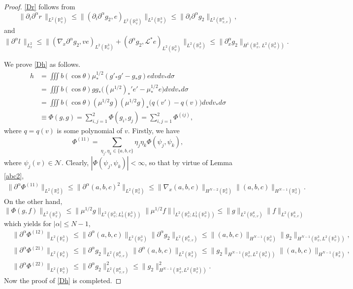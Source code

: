 \documentclass{amsart}[12pt, article]
\begin{document}
\begin{proof}
\eqref{Dr} follows {}from
\[
\|{{\partial}}_i{{\partial}}^\alpha r\,\|_{L^2({{{\mathbb R}}}^3_x)}
\le
\| ({{\partial}}_i{{\partial}}^\alpha g_2, e)_{L^2({{{\mathbb R}}}^3_v)}\|_{L^2({{{\mathbb R}}}^3_x)}
\le
\|{{\partial}}_i{{\partial}}^\alpha  g_2\|_{L^2({{{\mathbb R}}}^6_{x, v})},
\]
and
\[
\|{{\partial}}^\alpha   l\,\|_{L^2_{x}}\le
\| (\nabla_x{{\partial}}^\alpha g_2, ve)_{L^2({{{\mathbb R}}}^3_v)}+({{\partial}}^\alpha g_2, \mathcal{L}^*e)_{L^2({{{\mathbb R}}}^3_v)}\|_{L^2({{{\mathbb R}}}^3_x)}
\le
\| {{\partial}}^{\alpha}_xg_2\|_{H^{1}({{{\mathbb R}}}^3_{x},\, L^2({{{\mathbb R}}}^3_v))}.
\]

We prove \eqref{Dh} as follows.
\begin{align*}
 h&=\iiint b(\cos\theta)\mu_*^{1/2}(g'_*g'-g_*g)edvdv_*d\sigma
\\&=\iiint b(\cos\theta)g g_*\Big((\mu^{1/2})_*'e'-\mu_*^{1/2}e\Big)dvdv_*d\sigma
\\&=\iiint b(\cos\theta)(\mu^{1/2}g)(\mu^{1/2} g)_*\Big(q(v')-q(v)\Big)dvdv_*d\sigma
\\&\equiv \Phi(g,g)=\sum_{i,j=1}^2\Phi(g_i,g_j)=\sum_{i,j=1}^2\Phi^{(ij)}, 
\end{align*}
where $q=q(v)$ is some polynomial of $v$.
Firstly, we have
\[
\Phi^{(11)}=\sum_{\eta_j, \eta_k\in \{a,b,c\}} \eta_j\eta_k\Phi(\psi_j,\psi_k),
\]
where $
\psi_j(v)\in \mathcal{N}$.
Clearly, $|\Phi(\psi_j,\psi_k)|<\infty$, so that by virtue of Lemma \ref{abc2},
\begin{align*}
 \|{{\partial}}^\alpha  \Phi^{(11)}\|_{L^2({{{\mathbb R}}}^3_x)}\le \|{{\partial}}^\alpha  (a,b,c)^2\|_{L^2({{{\mathbb R}}}^3_x)}
 \le \|\nabla_x (a,b,c)\|_{H^{N-2}({{{\mathbb R}}}^3_x)}\|(a,b,c)\|_{H^{N-1}({{{\mathbb R}}}^3_x)}.
\end{align*}
On the other hand,
\[
\|\Phi(g,f)\|_{L^2({{{\mathbb R}}}^3_x)}\le \|\mu^{1/2}g\|_{{L^2({{{\mathbb R}}}^3_x; L^1_3({{{\mathbb R}}}_v^3))}}
\|\mu^{1/2}f\||_{{L^2({{{\mathbb R}}}^3_x; L^1_3({{{\mathbb R}}}_v^3))}}
\le \|g\|_{L^2({{{\mathbb R}}}^6_{x, v})}\|f\|_{L^2({{{\mathbb R}}}^6_{x, v})}
\]
which yields for $|\alpha|\le N-1$,
\begin{align*}
 &
  \|{{\partial}}^\alpha   \Phi^{(12)}\|_{L^2({{{\mathbb R}}}^3_x)}\le \|{{\partial}}^\alpha  (a,b,c)\|_{L^2({{{\mathbb R}}}^3_x)}
  \|{{\partial}}^\alpha  g_2\|_{L^2({{{\mathbb R}}}^6_{x, v})}
  \le \|  (a,b,c)\|_{H^{N-1}({{{\mathbb R}}}^3_x)}\|g_2\|_{H^{N-1}({{{\mathbb R}}}^3_x, L^2({{{\mathbb R}}}^3_v))},
 \\
 & \|{{\partial}}^\alpha   \Phi^{(21)}\|_{L^2({{{\mathbb R}}}^3_x)}\le \|{{\partial}}^\alpha  g_2\|_{L^2({{{\mathbb R}}}^6_{x, v})}
 \|{{\partial}}^\alpha  (a,b,c)\|_{L^2({{{\mathbb R}}}^3_x)}
\le \|g_2\|_{H^{N-1}({{{\mathbb R}}}^3_x, L^2({{{\mathbb R}}}^3_v))}\|  (a,b,c)\|_{H^{N-1}({{{\mathbb R}}}^3_x)},
 \\
 &\|{{\partial}}^\alpha   \Phi^{(22)}\|_{L^2({{{\mathbb R}}}^3_x)}\le \|{{\partial}}^\alpha  g_2\|_{L^2({{{\mathbb R}}}^6_{x, v})}^2
\le \|g_2\|_{H^{N-1}({{{\mathbb R}}}^3_x, L^2({{{\mathbb R}}}^3_{v}))}^2.
 \end{align*}
Now the proof of \eqref{Dh} is completed.
\end{proof}
\end{document}
